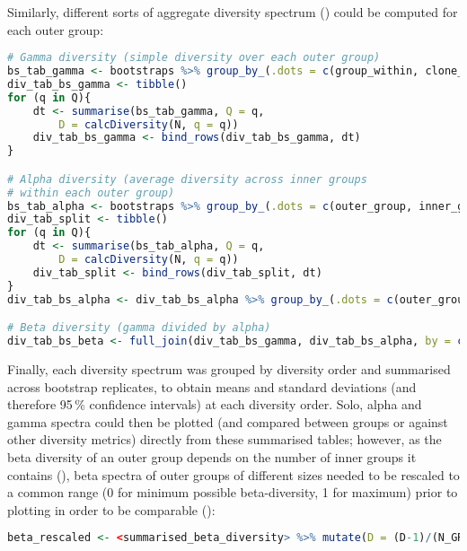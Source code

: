 \noindent Similarly, different sorts of aggregate diversity spectrum () could be computed for each outer group:

\begin{lstlisting}[language=R]
# Gamma diversity (simple diversity over each outer group)
bs_tab_gamma <- bootstraps %>% group_by_(.dots = c(group_within, clone_field, "ITER")) %>% summarise(N = sum(N)) %>% group_by_(.dots = c(outer_group, "ITER"))
div_tab_bs_gamma <- tibble()
for (q in Q){
	dt <- summarise(bs_tab_gamma, Q = q,
		D = calcDiversity(N, q = q))
	div_tab_bs_gamma <- bind_rows(div_tab_bs_gamma, dt)
}

# Alpha diversity (average diversity across inner groups
# within each outer group)
bs_tab_alpha <- bootstraps %>% group_by_(.dots = c(outer_group, inner_group, "ITER"))
div_tab_split <- tibble()
for (q in Q){
	dt <- summarise(bs_tab_alpha, Q = q,
		D = calcDiversity(N, q = q))
	div_tab_split <- bind_rows(div_tab_split, dt)
}
div_tab_bs_alpha <- div_tab_bs_alpha %>% group_by_(.dots = c(outer_group, "ITER", "Q")) %>% summarise(D = ifelse(dplyr::first(Q) != 1, mean(D^(1-dplyr::first(Q)))^(1/(1-dplyr::first(Q))),  exp(mean(log(D)))), N_GROUP = n())

# Beta diversity (gamma divided by alpha)
div_tab_bs_beta <- full_join(div_tab_bs_gamma, div_tab_bs_alpha, by = c(outer_group, "ITER", "Q"), suffix = c("_GAMMA", "_ALPHA")) %>% mutate(D= D_GAMMA/D_ALPHA) %>% select(-D_GAMMA, -D_ALPHA)
\end{lstlisting}

\noindent Finally, each diversity spectrum was grouped by diversity order and summarised across bootstrap replicates, to obtain means and standard deviations (and therefore 95\,\% confidence intervals) at each diversity order. Solo, alpha and gamma spectra could then be plotted (and compared between groups or against other diversity metrics) directly from these summarised tables; however, as the beta diversity of an outer group depends on the number of inner groups it contains (), beta spectra of outer groups of different sizes needed to be rescaled to a common range (0 for minimum possible beta-diversity, 1 for maximum) prior to plotting in order to be comparable ():

\begin{lstlisting}[language=R]
beta_rescaled <- <summarised_beta_diversity> %>% mutate(D = (D-1)/(N_GROUP-1), D_UPPER = (D_UPPER-1)/(N_GROUP-1), D_LOWER = (D_LOWER-1)/(N_GROUP-1), D_SD = D_SD/(N_GROUP-1)) %>% select(-N_GROUP)
\end{lstlisting}

